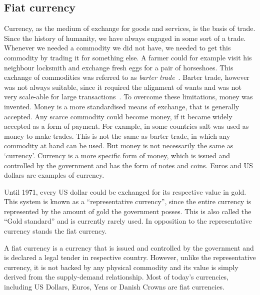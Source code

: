 \subsection{Fiat  currency}
% 
Currency, as the medium of exchange for goods and services, is the basis of trade. Since the history of humanity, we have always engaged in some sort of a trade. Whenever we needed a commodity we did not have, we needed to get this commodity by trading it for something else. A farmer could for example visit his neighbour locksmith and exchange fresh eggs for a pair of horseshoes. This exchange of commodities was referred to as \textit{barter trade}~\cite{Sullivan2009BarterEconomics}. Barter trade, however was not always suitable, since it required the alignment of wants and was not very scale-able for large transactions~\cite{Carroll2015CreatingExchange}. To overcome these limitations, money was invented. Money is a more standardised means of exchange, that is generally accepted. Any scarce commodity could become money, if it became widely accepted as a form of payment. For example, in some countries salt was used as money to make trades. This is not the same as barter trade, in which any commodity at hand can be used. But money is not necessarily the same as `currency'. Currency is a more specific form of money, which is issued and controlled by the government and has the form of notes and coins\footnotemark. Euros and US dollars are examples of currency.
% 

Until 1971, every US dollar could be exchanged for its respective value in gold. This system is known as a ``representative currency'', since the entire currency is represented by the amount of gold the government posses. This is also called the ``Gold standard'' and is currently rarely used. In opposition to the representative currency stands the fiat currency. 

A fiat currency is a currency that is issued and controlled by the government and is declared a legal tender in respective country. However, unlike the representative currency, it is not backed by any physical commodity and its value is simply derived from the supply-demand relationship\footnotemark. Most of today's currencies, including US Dollars, Euros, Yens or Danish Crowns are fiat currencies.
% 
